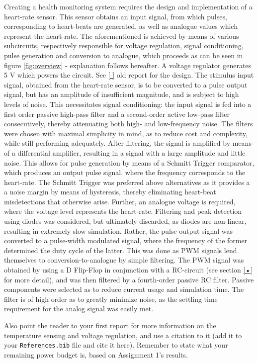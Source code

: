 Creating a health monitoring system requires the design and implementation of a heart-rate sensor. This sensor obtains an input signal, from which pulses, corresponding to heart-beats are generated, as well as analogue values which represent the heart-rate. The aforementioned is achieved by means of various subcircuits, respectively responsible for voltage regulation, signal conditioning, pulse generation and conversion to analogue, which proceeds as can be seen in figure \ref{fig:overview} - explanation follows hereafter.
A voltage regulator generates 5 V which powers the circuit. See \ref{ } old report for the design. The stimulus input signal, obtained from the heart-rate sensor, is to be converted to a pulse output signal, but has an amplitude of insufficient magnitude, and is subject to high levels of noise. This necessitates signal conditioning: the input signal is fed into a first order passive high-pass filter and a second-order active low-pass filter consecutively, thereby attenuating both high- and low-frequency noise. The filters were chosen with maximal simplicity in mind, as to reduce cost and complexity, while still performing adequately. After filtering, the signal is amplified by means of a differential amplifier, resulting in a signal with a large amplitude and little noise. This allows for pulse generation by means of a Schmitt Trigger comparator, which produces an output pulse signal, where the frequency corresponds to the heart-rate. The Schmitt Trigger was preferred above alternatives as it provides a a noise margin by means of hysteresis, thereby eliminating heart-beat misdetections that otherwise arise. Further, an analogue voltage is required, where the voltage level represents the heart-rate. Filtering and peak detection using diodes was considered, but ultimately discarded, as diodes are non-linear, resulting in extremely slow simulation. Rather, the pulse output signal was converted to a pulse-width modulated signal, where the frequency of the former determined the duty cycle of the latter. This was done as PWM signals lend themselves to conversion-to-analogue by simple filtering. The PWM signal was obtained by using a D Flip-Flop in conjunction with a RC-circuit (see section \ref{•} for more detail), and was then filtered by a fourth-order passive RC filter. Passive components were selected as to reduce current usage and simulation time. The filter is of high order as to greatly minimize noise, as the settling time requirement for the analog signal was easily met.

\pagebreak


Also point the reader to your first report for more information on the temperature sensing and voltage regulation, and use a citation to it (add it to your \texttt{References.bib} file and cite it here). Remember to state what your remaining power budget is, based on Assignment 1's results. 








